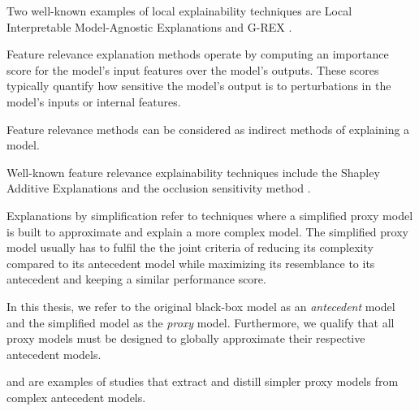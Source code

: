 \begin{remark}
  Two well-known examples of local explainability techniques are Local
  Interpretable Model-Agnostic Explanations \citep{lime} and G-REX
  \citep{konig2008g}.
\end{remark}

\begin{definition}
  Feature relevance explanation methods operate by computing an importance score
  for the model's input features over the model's outputs. These
  scores typically quantify how sensitive the model's output is to perturbations
  in the model's inputs or internal features.
\end{definition}

\begin{remark}
  Feature relevance methods can be considered as indirect methods of explaining
  a model.
\end{remark}

\begin{remark}
  Well-known feature relevance explainability techniques include the Shapley
  Additive Explanations \citep{lundberg2017unified} and the occlusion
  sensitivity method \citep{zeiler2014visualizing}.
\end{remark}

\begin{definition}
  \label{def:explain_simplify}
  Explanations by simplification refer to techniques where a simplified proxy
  model is built to approximate and explain a more complex model. The simplified
  proxy model usually has to fulfil the the joint criteria of reducing its
  complexity compared to its antecedent model while maximizing its resemblance
  to its antecedent and keeping a similar performance score.
\end{definition}

\begin{remark}
  In this thesis, we refer to the original black-box model as an
  \textit{antecedent} model and the simplified model as the \textit{proxy}
  model. Furthermore, we qualify that all proxy models must be designed to
  globally approximate their respective antecedent models.
\end{remark}

\begin{remark}
  \citet{bastani2017interpretability} and \citet{tan2018distill} are examples of
  studies that extract and distill simpler proxy models from complex antecedent
  models.
\end{remark}

